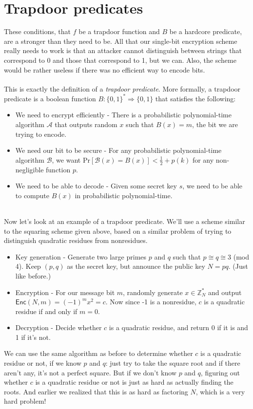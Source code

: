 \documentclass[10pt]{article}
\begin{document}
\section{Trapdoor predicates}
These conditions, that $ f $ be a trapdoor function and $ B $ be a hardcore predicate, are a stronger than they need to be.  All that our single-bit encryption scheme really needs to work is that an attacker cannot distinguish between strings that correspond to 0 and those that correspond to 1, but we can.  Also, the scheme would be rather useless if there was no efficient way to encode bits.
\\ ~ \\
This is exactly the definition of a \textit{trapdoor predicate}.  More formally, a trapdoor predicate is a boolean function $ B: \{ 0,1 \}^\ast \Rightarrow \{ 0,1 \} $ that satisfies the following:
\begin{itemize}
\item We need to encrypt efficiently - There is a probabilistic polynomial-time algorithm $ \mathcal{A} $ that outputs random $ x $ such that $ B(x) = m $, the bit we are trying to encode.
\item We need our bit to be secure - For any probabilistic polynomial-time algorithm $ \mathcal{B} $, we want $ \text{Pr}[\mathcal{B}(x) = B(x)] < \frac{1}{2} + p(k) $ for any non-negligible function $ p $.
\item We need to be able to decode - Given some secret key $ s $, we need to be able to compute $ B(x) $ in probabilistic polynomial-time.
\end{itemize}
~ \\
Now let's look at an example of a trapdoor predicate.  We'll use a scheme similar to the squaring scheme given above, based on a similar problem of trying to distinguish quadratic residues from nonresidues.
\begin{itemize}
\item Key generation - Generate two large primes $ p $ and $ q $ such that $ p \cong q \cong 3 $ (mod 4).  Keep $ (p,q) $ as the secret key, but announce the public key $ N = pq $.  (Just like before.)
\item Encryption - For our message bit $ m $, randomly generate $ x \in \mathbb{Z}_N^\ast $ and output $ \mathsf{Enc}(N, m) = (-1)^mx^2 = c $.  Now since -1 is a nonresidue, $ c $ is a quadratic residue if and only if $ m = 0 $.
\item Decryption - Decide whether $ c $ is a quadratic residue, and return 0 if it is and 1 if it's not.
\end{itemize}
We can use the same algorithm as before to determine whether $ c $ is a quadratic residue or not, if we know $ p $ and $ q $: just try to take the square root and if there aren't any, it's not a perfect square.  But if we don't know $ p $ and $ q $, figuring out whether $ c $ is a quadratic residue or not is just as hard as actually finding the roots.  And earlier we realized that this is as hard as factoring $ N $, which is a very hard problem!
\end{document}
